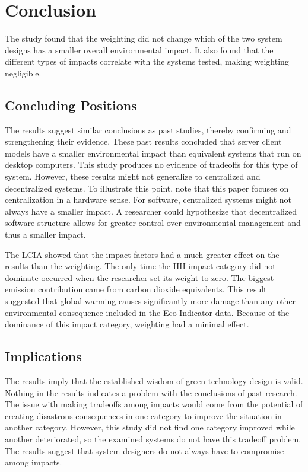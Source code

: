 \documentclass[final,journal,10pt,letterpaper,oneside,twocolumn,compsoc]%
{IEEEtran}
\begin{document}

\section{Conclusion}
The study found that the weighting did not change which
of the two system designs has a smaller overall environmental impact. It also
found
that the different types of impacts correlate with the systems tested, making
weighting negligible.

\subsection{Concluding Positions}
The results suggest similar conclusions as past studies, thereby confirming and
strengthening their evidence. These past results
concluded that server client
models have a smaller environmental impact than equivalent systems that run on
desktop computers. This study produces no evidence of tradeoffs for this type
of system. However, these results might not generalize to centralized and
decentralized systems. To illustrate this point, note that this paper focuses on
centralization in a hardware sense. For software, centralized systems might not
always have a smaller impact. A researcher could hypothesize that decentralized
software structure allows for greater control over environmental management and
thus a smaller impact. 

The LCIA showed that the impact factors had a much greater effect on the
results than the weighting.
The only time the HH impact category did not dominate occurred when
the researcher set its weight to zero. The biggest emission contribution came
from carbon dioxide equivalents. This result suggested that global warming
causes significantly more damage than any other environmental consequence
included in the Eco-Indicator data. Because of the dominance of this impact
category, weighting had a minimal effect.

\subsection{Implications}
The results imply that the established wisdom of green technology design is
valid. Nothing in the results indicates a problem with the conclusions of
past research. The issue with making tradeoffs among impacts would come from the
potential of creating disastrous consequences in one category to improve the
situation in another category. However, this study did not find one category
improved while another deteriorated, so the examined systems do not have this
tradeoff problem. The results suggest that system designers do not always have
to compromise among impacts.
\end{document}
